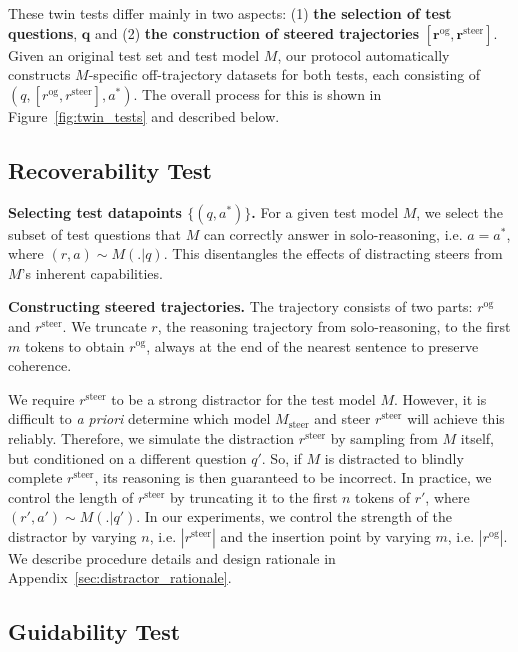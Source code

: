 \documentclass{article} %
\begin{document}
These twin tests differ mainly in two aspects: (1) \textbf{the selection of test questions}, $\bm{q}$ and (2) \textbf{the construction of steered trajectories} $\bm{[r^\mathrm{og}, r^\mathrm{steer}]}$. Given an original test set and test model $M$, our protocol automatically constructs $M$-specific off-trajectory datasets for both tests, each consisting of $(q, [r^\mathrm{og}, r^\mathrm{steer}], a^*)$. The overall process for this is shown in Figure~\ref{fig:twin_tests} and described below. 


\subsection{Recoverability Test}
\label{sec:recoverability_math}

\textbf{Selecting test datapoints \boldmath$\{(q, a^*)\}$.} For a given test model $M$, we select the subset of test questions that $M$ can correctly answer in solo-reasoning, i.e. $a = a^*$, where $(r, a) \sim M(.|q)$. This disentangles the effects of distracting steers from $M$'s inherent capabilities.


\textbf{Constructing steered trajectories.} The trajectory consists of two parts: $r^\mathrm{og}$ and $r^\mathrm{steer}$.
We truncate $r$, the reasoning trajectory from solo-reasoning, to the first $m$ tokens to obtain $r^\mathrm{og}$, always at the end of the nearest sentence to preserve coherence.

We require $r^\mathrm{steer}$ to be a strong distractor for the test model $M$. However, it is difficult to \emph{a priori} determine which model $M_\mathrm{steer}$ and steer $r^\mathrm{steer}$ will achieve this reliably. Therefore, we simulate the distraction $r^\mathrm{steer}$ by sampling from $M$ itself, but conditioned on a different question $q'$. So, if $M$ is distracted to blindly complete $r^\mathrm{steer}$, its reasoning is then guaranteed to be incorrect. In practice, we control the length of $r^\mathrm{steer}$ by truncating it to the first $n$ tokens of $r'$, where $(r', a') \sim M(.|q')$. In our experiments, we control the strength of the distractor by varying $n$, i.e. $|r^{\mathrm{steer}}|$ and the insertion point by varying $m$, i.e. $|r^\mathrm{og}|$. We describe procedure details and design rationale in Appendix~\ref{sec:distractor_rationale}.

\subsection{Guidability Test}
\label{sec:guidability_math}
\end{document}
